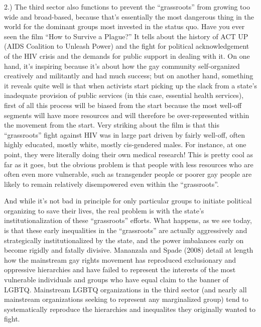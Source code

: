 \documentclass[12pt,book]{article}
\begin{document}
2.) The third sector also functions to prevent the ``grassroots'' from
growing too wide and broad-based, because that's essentially the most
dangerous thing in the world for the dominant groups most invested in
the status quo. Have you ever seen the film ``How to Survive a Plague?''
It tells about the history of ACT UP (AIDS Coalition to Unleash Power)
and the fight for political acknowledgement of the HIV crisis and the
demands for public support in dealing with it. On one hand, it's
inspiring because it's about how the gay community self-organized
creatively and militantly and had much success; but on another hand,
something it reveals quite well is that when activists start picking up
the slack from a state's inadequate provision of public services (in
this case, essential health services), first of all this process will be
biased from the start because the most well-off segments will have more
resources and will therefore be over-represented within the movement
from the start. Very striking about the film is that this ``grassroots''
fight against HIV was in large part driven by fairly well-off, often
highly educated, mostly white, mostly cis-gendered males. For instance,
at one point, they were literally doing their own medical research! This
is pretty cool as far as it goes, but the obvious problem is that people
with less resources who are often even more vulnerable, such as
transgender people or poorer gay people are likely to remain relatively
disempowered even within the ``grassroots''.

And while it's not bad in principle for only particular groups to
initiate political organizing to save their lives, the real problem is
with the state's institutionalization of these ``grassroots'' efforts.
What happens, as we see today, is that these early inequalities in the
``grassroots'' are actually aggressively and strategically
institutionalized by the state, and the power imbalances early on become
rigidly and fatally divisive. Mananzala and Spade (2008) detail at
length how the mainstream gay rights movement has reproduced
exclusionary and oppressive hierarchies and have failed to represent the
interests of the most vulnerable individuals and groups who have equal
claim to the banner of LGBTQ. Mainstream LGBTQ organizations in the
third sector (and nearly all mainstream organizations seeking to
represent any marginalized group) tend to systematically reproduce the
hierarchies and inequalites they originally wanted to fight.
\end{document}
